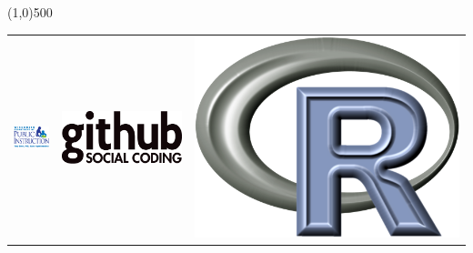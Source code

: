 \documentclass{article}
\begin{document}
\line(1,0){500}

\vfill{}



\begin{center}
\begin{tabular}{|c|c|c|}
\includegraphics[height=.05\paperheight]{dpilogo} &
\includegraphics[height=.05\paperheight]{GitHublogo}&
\includegraphics[height=.05\paperheight]{Rlogo} 
\end{tabular}
\end{center}
\end{document}
